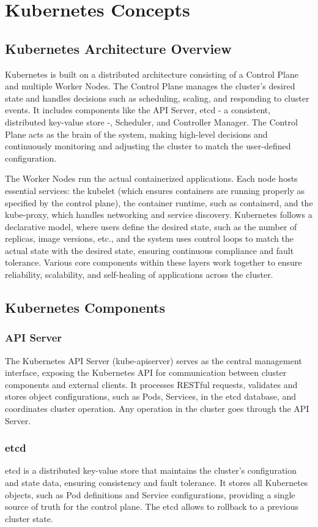 \section{Kubernetes Concepts}
\subsection{Kubernetes Architecture Overview}
Kubernetes is built on a distributed architecture consisting of a Control Plane and multiple Worker Nodes. The Control Plane manages the cluster's desired state and handles decisions such as scheduling, scaling, and responding to cluster events. It includes components like the API Server, etcd - a consistent, distributed key-value store -, Scheduler, and Controller Manager. The Control Plane acts as the brain of the system, making high-level decisions and continuously monitoring and adjusting the cluster to match the user-defined configuration.

The Worker Nodes run the actual containerized applications. Each node hosts essential services: the kubelet (which ensures containers are running properly as specified by the control plane), the container runtime, such as containerd, and the kube-proxy, which handles networking and service discovery. Kubernetes follows a declarative model, where users define the desired state, such as the number of replicas, image versions, etc., and the system uses control loops to match the actual state with the desired state, ensuring continuous compliance and fault tolerance. Various core components within these layers work together to ensure reliability, scalability, and self-healing of applications across the cluster.

\subsection{Kubernetes Components}
\subsubsection{API Server}
The Kubernetes API Server (kube-apiserver) serves as the central management interface, exposing the Kubernetes API for communication between cluster components and external clients. It processes RESTful requests, validates and stores object configurations, such as Pods, Services, in the etcd database, and coordinates cluster operation. Any operation in the cluster goes through the API Server.

\subsubsection{etcd}
etcd is a distributed key-value store that maintains the cluster's configuration and state data, ensuring consistency and fault tolerance. It stores all Kubernetes objects, such as Pod definitions and Service configurations, providing a single source of truth for the control plane. The etcd allows to rollback to a previous cluster state.

